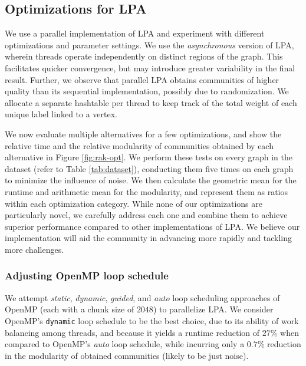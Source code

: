 \subsection{Optimizations for LPA}
\label{sec:lpa}

We use a parallel implementation of LPA and experiment with different optimizations and parameter settings. We use the \textit{asynchronous} version of LPA, wherein threads operate independently on distinct regions of the graph. This facilitates quicker convergence, but may introduce greater variability in the final result. Further, we observe that parallel LPA obtains communities of higher quality than its sequential implementation, possibly due to randomization. We allocate a separate hashtable per thread to keep track of the total weight of each unique label linked to a vertex.


We now evaluate multiple alternatives for a few optimizations, and show the relative time and the relative modularity of communities obtained by each alternative in Figure \ref{fig:rak-opt}. We perform these tests on every graph in the dataset (refer to Table \ref{tab:dataset}), conducting them five times on each graph to minimize the influence of noise. We then calculate the geometric mean for the runtime and arithmetic mean for the modularity, and represent them as ratios within each optimization category. While none of our optimizations are particularly novel, we carefully address each one and combine them to achieve superior performance compared to other implementations of LPA. We believe our implementation will aid the community in advancing more rapidly and tackling more challenges.


\subsubsection{Adjusting OpenMP loop schedule}

We attempt \textit{static}, \textit{dynamic}, \textit{guided}, and \textit{auto} loop scheduling approaches of OpenMP (each with a chunk size of $2048$) to parallelize LPA. We consider OpenMP's \verb|dynamic| loop schedule to be the best choice, due to its ability of work balancing among threads, and because it yields a runtime reduction of $27\%$ when compared to OpenMP's \textit{auto} loop schedule, while incurring only a $0.7\%$ reduction in the modularity of obtained communities (likely to be just noise).



